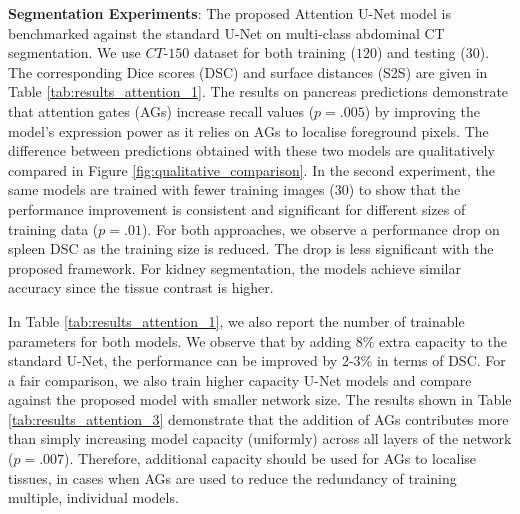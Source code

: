 \documentclass{article}
\begin{document}
\textbf{Segmentation Experiments}: The proposed Attention U-Net model is benchmarked against the standard U-Net on multi-class abdominal CT segmentation. We use $CT$-$150$ dataset for both training ($120$) and testing ($30$). The corresponding Dice scores (DSC) and surface distances (S2S) are given in Table \ref{tab:results_attention_1}. The results on pancreas predictions demonstrate that attention gates (AGs) increase recall values ($p = .005$) by improving the model's expression power as it relies on AGs to localise foreground pixels. The difference between predictions obtained with these two models are qualitatively compared in Figure \ref{fig:qualitative_comparison}. In the second experiment, the same models are trained with fewer training images ($30$) to show that the performance improvement is consistent and significant for different sizes of training data ($p = .01$). For both approaches, we observe a performance drop on spleen DSC as the training size is reduced. The drop is less significant with the proposed framework. For kidney segmentation, the models achieve similar accuracy since the tissue contrast is higher.
	
In Table \ref{tab:results_attention_1}, we also report the number of trainable parameters for both models. We observe that by adding 8\% extra capacity to the standard U-Net, the performance can be improved by 2-3\% in terms of DSC. For a fair comparison, we also train higher capacity U-Net models and compare against the proposed model with smaller network size. The results shown in Table \ref{tab:results_attention_3} demonstrate that the addition of AGs contributes more than simply increasing model capacity (uniformly) across all layers of the network ($p=.007$). Therefore, additional capacity should be used for AGs to localise tissues, in cases when AGs are used to reduce the redundancy of training multiple, individual models.
\end{document}
